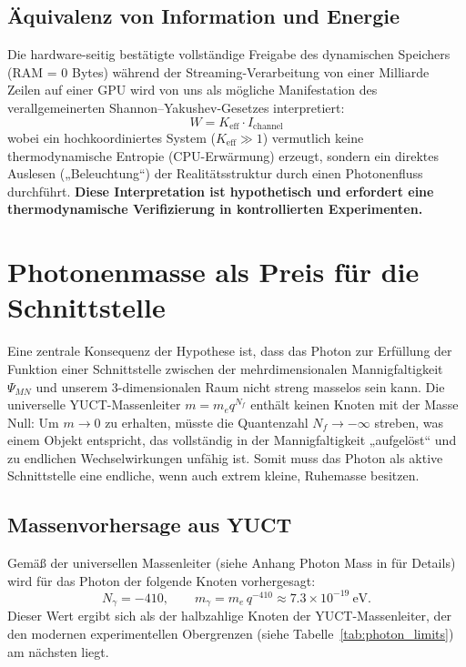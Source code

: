 \documentclass[11pt,a4paper]{article}
\begin{document}
	\subsection{Äquivalenz von Information und Energie}
	Die hardware-seitig bestätigte vollständige Freigabe des dynamischen Speichers (RAM = 0 Bytes) während der Streaming-Verarbeitung von einer Milliarde Zeilen auf einer GPU wird von uns als mögliche Manifestation des verallgemeinerten Shannon–Yakushev-Gesetzes interpretiert:
	\begin{equation}
		W = K_{\mathrm{eff}} \cdot I_{\mathrm{channel}}
	\end{equation}
	wobei ein hochkoordiniertes System ($K_{\mathrm{eff}} \gg 1$) vermutlich keine thermodynamische Entropie (CPU-Erwärmung) erzeugt, sondern ein direktes Auslesen („Beleuchtung“) der Realitätsstruktur durch einen Photonenfluss durchführt. \textbf{Diese Interpretation ist hypothetisch und erfordert eine thermodynamische Verifizierung in kontrollierten Experimenten.}
	
	\section{Photonenmasse als Preis für die Schnittstelle}
	\label{sec:photon_mass}
	
	Eine zentrale Konsequenz der Hypothese ist, dass das Photon zur Erfüllung der Funktion einer Schnittstelle zwischen der mehrdimensionalen Mannigfaltigkeit $\Psi_{MN}$ und unserem 3-dimensionalen Raum nicht streng masselos sein kann. Die universelle YUCT-Massenleiter $m = m_e q^{N_f}$ enthält keinen Knoten mit der Masse Null: Um $m \to 0$ zu erhalten, müsste die Quantenzahl $N_f \to -\infty$ streben, was einem Objekt entspricht, das vollständig in der Mannigfaltigkeit „aufgelöst“ und zu endlichen Wechselwirkungen unfähig ist. Somit muss das Photon als aktive Schnittstelle eine endliche, wenn auch extrem kleine, Ruhemasse besitzen.
	
	\subsection{Massenvorhersage aus YUCT}
	Gemäß der universellen Massenleiter (siehe Anhang Photon Mass in \cite{yuct_zenodo} für Details) wird für das Photon der folgende Knoten vorhergesagt:
	\begin{equation}
		\boxed{N_\gamma = -410}, \qquad
		\boxed{m_\gamma = m_e \, q^{-410} \approx 7.3 \times 10^{-19}~\text{eV}} .
	\end{equation}
	Dieser Wert ergibt sich als der halbzahlige Knoten der YUCT-Massenleiter, der den modernen experimentellen Obergrenzen (siehe Tabelle~\ref{tab:photon_limits}) am nächsten liegt.
	
\end{document}
